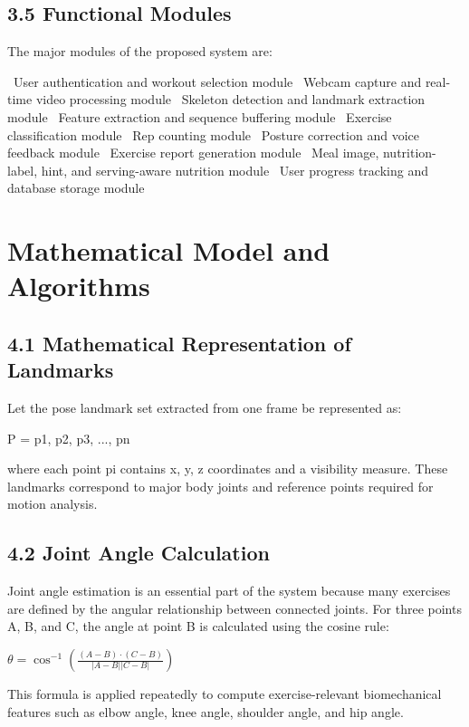 \documentclass[12pt,a4paper]{report}
\begin{document}
\section{3.5 Functional Modules}
The major modules of the proposed system are:

\noindent\textbullet\ User authentication and workout selection module  
\noindent\textbullet\ Webcam capture and real-time video processing module  
\noindent\textbullet\ Skeleton detection and landmark extraction module  
\noindent\textbullet\ Feature extraction and sequence buffering module  
\noindent\textbullet\ Exercise classification module  
\noindent\textbullet\ Rep counting module  
\noindent\textbullet\ Posture correction and voice feedback module  
\noindent\textbullet\ Exercise report generation module  
\noindent\textbullet\ Meal image, nutrition-label, hint, and serving-aware nutrition module  
\noindent\textbullet\ User progress tracking and database storage module


\chapter{Mathematical Model and Algorithms}

\section{4.1 Mathematical Representation of Landmarks}
Let the pose landmark set extracted from one frame be represented as:

P = {p1, p2, p3, ..., pn}

where each point pi contains x, y, z coordinates and a visibility measure. These landmarks correspond to major body joints and reference points required for motion analysis.

\section{4.2 Joint Angle Calculation}
Joint angle estimation is an essential part of the system because many exercises are defined by the angular relationship between connected joints. For three points A, B, and C, the angle at point B is calculated using the cosine rule:

$\theta = \cos^{-1} \left( \frac{(A-B) \cdot (C-B)}{|A-B||C-B|} \right)$

This formula is applied repeatedly to compute exercise-relevant biomechanical features such as elbow angle, knee angle, shoulder angle, and hip angle.
\end{document}
